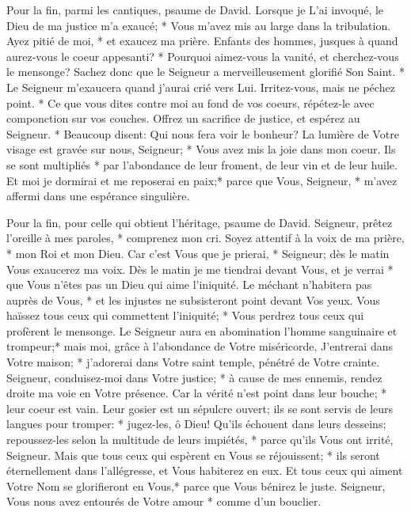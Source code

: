 Pour la fin, parmi les cantiques, psaume de David.
Lorsque je L'ai invoqué, le Dieu de ma justice m'a exaucé; * Vous m'avez mis au large dans la tribulation. Ayez pitié de moi, * et exaucez ma prière.
Enfants des hommes, jusques à quand aurez-vous le coeur appesanti? * Pourquoi aimez-vous la vanité, et cherchez-vous le mensonge?
Sachez donc que le Seigneur a merveilleusement glorifié Son Saint. * Le Seigneur m'exaucera quand j'aurai crié vers Lui.
Irritez-vous, mais ne péchez point. * Ce que vous dites contre moi au fond de vos coeurs, répétez-le avec componction sur vos couches.
Offrez un sacrifice de justice, et espérez au Seigneur. * Beaucoup disent: Qui nous fera voir le bonheur?
La lumière de Votre visage est gravée sur nous, Seigneur; * Vous avez mis la joie dans mon coeur.
Ils se sont multipliés * par l'abondance de leur froment, de leur vin et de leur huile.
Et moi je dormirai et me reposerai en paix;*
parce que Vous, Seigneur, * m'avez affermi dans une espérance singulière.

Pour la fin, pour celle qui obtient l'héritage, psaume de David.
Seigneur, prêtez l'oreille à mes paroles, * comprenez mon cri.
Soyez attentif à la voix de ma prière, * mon Roi et mon Dieu.
Car c'est Vous que je prierai, * Seigneur; dès le matin Vous exaucerez ma voix.
Dès le matin je me tiendrai devant Vous, et je verrai * que Vous n'êtes pas un Dieu qui aime l'iniquité.
Le méchant n'habitera pas auprès de Vous, * et les injustes ne subsisteront point devant Vos yeux.
Vous haïssez tous ceux qui commettent l'iniquité; * Vous perdrez tous ceux qui profèrent le mensonge. Le Seigneur aura en abomination l'homme sanguinaire et trompeur;*
mais moi, grâce à l'abondance de Votre miséricorde, J'entrerai dans Votre maison; * j'adorerai dans Votre saint temple, pénétré de Votre crainte.
Seigneur, conduisez-moi dans Votre justice; * à cause de mes ennemis, rendez droite ma voie en Votre présence.
Car la vérité n'est point dans leur bouche; * leur coeur est vain.
Leur gosier est un sépulcre ouvert; ils se sont servis de leurs langues pour tromper: * jugez-les, ô Dieu! Qu'ils échouent dans leurs desseins; repoussez-les selon la multitude de leurs impiétés, * parce qu'ils Vous ont irrité, Seigneur.
Mais que tous ceux qui espèrent en Vous se réjouissent; * ils seront éternellement dans l'allégresse, et Vous habiterez en eux. Et tous ceux qui aiment Votre Nom se glorifieront en Vous,*
parce que Vous bénirez le juste. Seigneur, Vous nous avez entourés de Votre amour * comme d'un bouclier.

